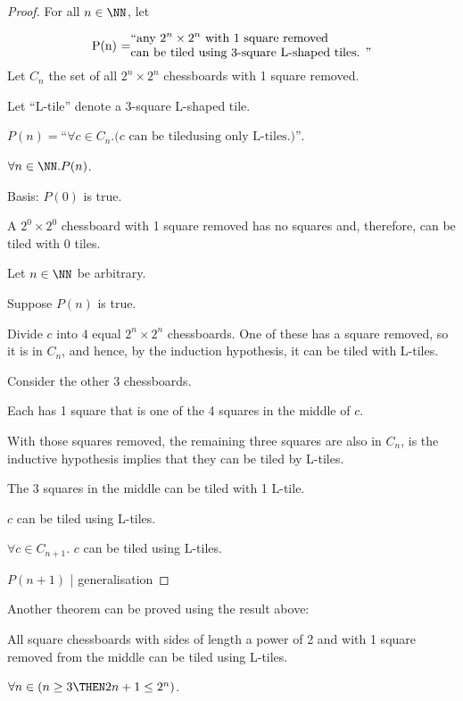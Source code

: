 \documentclass[11pt]{scrartcl}
\begin{document}
\begin{proof}
  For all $n\in\NN$, let

  \[\shortstack[l]{ P(n) =\\ \ }
    \text{\shortstack[l]{ ``any $2^n\times 2^n$ with 1 square
        removed\\ can be tiled using 3-square L-shaped tiles. '' }}\]
  Let $C_n$ the set of all $2^n\times 2^n$ chessboards with 1 square removed.

  Let ``L-tile'' denote a 3-square L-shaped tile.

  $P(n) = \text{``$\forall c\in C_n.(c$ can be tiledusing only L-tiles.$)$''}$.

  $\forall n\in \NN. P(n)$.

  Basis: $P(0)$ is true.

  A $2^0\times 2^0$ chessboard with 1 square removed has no squares
  and, therefore, can be tiled with 0 tiles.

  Let $n\in\NN$ be arbitrary.

  Suppose $P(n)$ is true.

  Divide $c$ into $4$ equal $2^n\times 2^n$ chessboards. One of these has a square removed, so it is in $C_n$, and hence, by the induction hypothesis, it can be tiled with L-tiles.

  Consider the other 3 chessboards.

  Each has 1 square that is one of the 4 squares in the middle of $c$.

  With those squares removed, the remaining three squares are also in
  $C_n$, is the inductive hypothesis implies that they can be tiled by
  L-tiles.

  The 3 squares in the middle can be tiled with 1 L-tile.

    $c$ can be tiled using L-tiles.
  
  $\forall c\in C_{n+1}.$ $c$ can be tiled using L-tiles.

  $P(n+1)$ | generalisation
  
\end{proof}

Another theorem can be proved using the result above:

\begin{theorem}
  All square chessboards with sides of length a power of 2 and with 1
  square removed from the middle can be tiled using L-tiles.
\end{theorem}

\begin{theorem}
$\forall n \in (n\geq 3 \THEN 2n+1 \leq 2^n)$.
\end{theorem}
\end{document}
